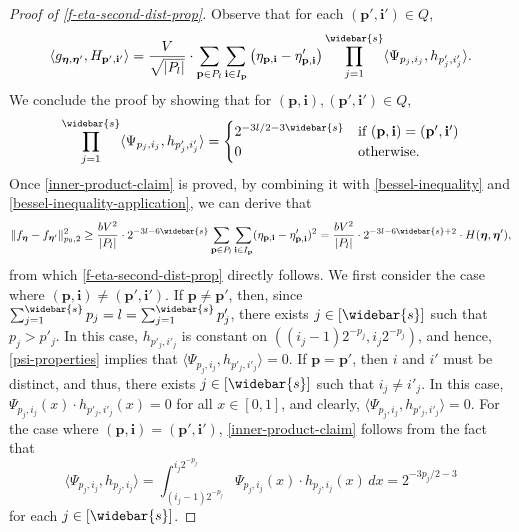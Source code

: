 \documentclass[10pt]{article}
\newcommand{\pbf}{{\mathbf{p}}}
\newcommand{\ibf}{{\mathbf{i}}}
\newcommand{\etabf}{{\boldsymbol{\eta}}}
\newcommand\inner[2]{\langle #1, #2 \rangle}
\begin{document}
\begin{proof}[Proof of \eqref{f-eta-second-dist-prop}]
Observe that for each $(\pbf', \ibf') \in Q$,  
\begin{equation}\label{bessel-inequality-application}
    \inner{g_{\etabf, \etabf'}}{H_{\pbf', \ibf'}} 
    = \frac{V}{\sqrt{|P_l|}} \cdot
    \sum_{\pbf \in P_l} \sum_{\ibf \in I_{\pbf}} 
    \big(\eta_{\pbf, \ibf} 
    - \eta'_{\pbf, \ibf}\big) 
    \prod_{j=1}^{\widebar{s}} \inner{\Psi_{p_j, i_j}}{h_{p'_j, i'_j}}. 
\end{equation}
We conclude the proof by showing that for 
$(\pbf, \ibf), (\pbf', \ibf') \in Q$, 
\begin{equation}\label{inner-product-claim}
    \prod_{j = 1}^{\widebar{s}} 
    \inner{\Psi_{p_j, i_j}}{h_{p'_j, i'_j}} =
    \begin{cases}
        2^{-3l/2 - 3\widebar{s}} &\mbox{if } 
        (\pbf, \ibf) = (\pbf', \ibf') \\
        0 &\mbox{otherwise}. 
    \end{cases}
\end{equation}
Once \eqref{inner-product-claim} is proved, by combining it with 
\eqref{bessel-inequality} and \eqref{bessel-inequality-application}, 
we can derive that 
\begin{equation*}
    \| f_{\etabf} - f_{\etabf'}\|_{p_0, 2}^2 
    \ge \frac{b V^2}{|P_l|} \cdot 
    2^{-3l - 6\widebar{s}} \sum_{\pbf \in P_l} 
    \sum_{\ibf \in I_{\pbf}} 
    (\eta_{\pbf, \ibf} - \eta'_{\pbf, \ibf})^2 
    = \frac{b V^2}{|P_l|} \cdot 2^{-3l - 6\widebar{s} + 2} 
    \cdot H(\etabf, \etabf'),
\end{equation*}
from which \eqref{f-eta-second-dist-prop} directly follows.
We first consider the case where 
$(\pbf, \ibf) \neq (\pbf', \ibf')$. 
If $\pbf \neq \mathbf{p'}$, then, 
since $\sum_{j = 1}^{\widebar{s}} p_j = l 
= \sum_{j = 1}^{\widebar{s}} p'_j$, there exists $j \in [\widebar{s}]$ 
such that $p_j > p'_j$. In this case, $h_{p'_j, i'_j}$ is constant 
on $((i_j - 1)2^{-p_j}, i_j 2^{-p_j})$, and hence, 
\eqref{psi-properties} implies that 
$\inner{\Psi_{p_j, i_j}}{h_{p'_j, i'_j}} = 0$. If 
$\pbf = \mathbf{p'}$, then $i$ and $i'$ must be distinct, and 
thus, there exists $j \in [\widebar{s}]$ such that $i_j \neq i'_j$. In 
this case, $\Psi_{p_j, i_j}(x) \cdot h_{p'_j, i'_j}(x) = 0$ for all 
$x \in [0, 1]$, and clearly, 
$\inner{\Psi_{p_j, i_j}}{h_{p'_j, i'_j}} = 0$. For the case where 
$(\pbf, \ibf) = (\pbf', \ibf')$, 
\eqref{inner-product-claim} follows from the fact that
\begin{equation*}
    \inner{\Psi_{p_j, i_j}}{h_{p_j, i_j}} 
    = \int_{(i_j - 1)2^{-p_j}}^{i_j2^{-p_j}} \Psi_{p_j, i_j}(x) \cdot
    h_{p_j, i_j}(x) \, dx 
    = 2^{-3p_j/2 - 3}
\end{equation*}
for each $j \in [\widebar{s}]$.
\end{proof}
\end{document}
